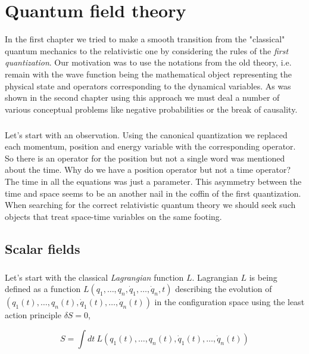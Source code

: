 \chapter{Quantum field theory}

In the first chapter we tried to make a smooth transition from the "classical" quantum mechanics
to the relativistic one by considering the rules of the \textit{first quantization}. Our motivation
was to use the notations from the old theory, i.e. remain with the wave function being the
mathematical object representing the physical state and operators corresponding to the dynamical 
variables. As was shown in the second chapter using this approach we must deal a number of
various conceptual problems like negative probabilities or the break of causality. 

\paragraph{} Let's start with an observation. Using the canonical quantization we replaced each momentum, position
and energy variable with the corresponding operator. So there is an operator for the position
but not a single word was mentioned about the time. Why do we have a position operator but not a
time operator? The time in all the equations was just a parameter. This asymmetry between the time
and space seems to be an another nail in the coffin of the first quantization. When searching for
the correct relativistic quantum theory we should seek such objects that treat space-time variables
on the same footing. 

\section{Scalar fields}

\paragraph{} Let's start with the classical \textit{Lagrangian} function $L$. Lagrangian $L$ is being defined as a 
function $L(q_{1}, \dots, q_{n}, \dot{q}_{1}, \dots, \dot{q}_{n}, t)$ describing the evolution of 
$(q_{1}(t), \dots, q_{n}(t), \dot{q}_{1}(t), \dots, \dot{q}_{n}(t))$ in the configuration space using the least action 
principle $\delta S = 0$,

\begin{equation}
    \label{eq:action}
    S = \int dt \ L(q_{1}(t), \dots, q_{n}(t), \dot{q}_{1}(t), \dots, \dot{q}_{n}(t))
\end{equation}

